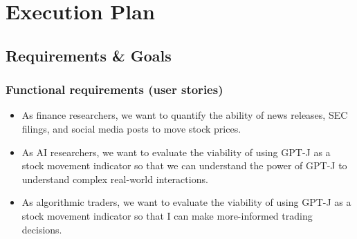 \documentclass[conference]{IEEEtran}
\begin{document}
\section{Execution Plan}
\subsection{Requirements \& Goals}
\subsubsection{Functional requirements (user stories)}
\begin{itemize}
	\item As finance researchers, we want to quantify the ability of news releases, SEC filings, and social media posts to move stock prices.
	\item As AI researchers, we want to evaluate the viability of using GPT-J as a stock movement indicator so that we can understand the power of GPT-J to understand complex real-world interactions.
	\item As algorithmic traders, we want to evaluate the viability of using GPT-J as a stock movement indicator so that I can make more-informed trading decisions.
\end{itemize}
\end{document}

